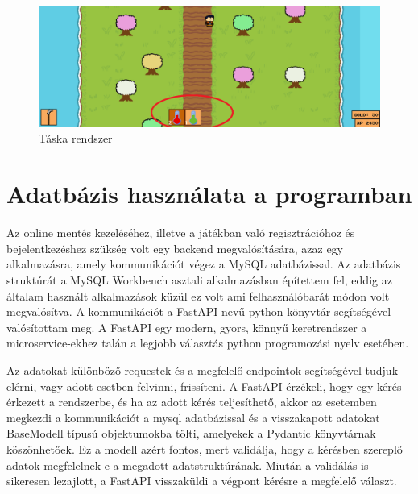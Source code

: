 \begin{figure}[H]
    \centering
    \includegraphics[width=15.5truecm]{images/inventory.png}
    \caption{Táska rendszer}
    \label{fig:Táska rendszer}
\end{figure}


\section{Adatbázis használata a programban}

\indent \indent Az online mentés kezeléséhez, illetve a játékban való regisztrációhoz és bejelentkezéshez szükség volt egy backend megvalósítására, azaz egy alkalmazásra, amely kommunikációt végez a MySQL \cite{mysql} adatbázissal. Az adatbázis struktúrát a MySQL Workbench \cite{mysql-workbench} asztali alkalmazásban építettem fel, eddig az általam használt alkalmazások küzül ez volt ami felhasználóbarát módon volt megvalósítva.  A kommunikációt a FastAPI \cite{fastapi} nevű python könyvtár segítségével valósítottam meg. A FastAPI egy modern, gyors, könnyű keretrendszer a microservice-ekhez talán a legjobb választás python programozási nyelv esetében.

Az adatokat különböző requestek és a megfelelő endpointok segítségével tudjuk elérni, vagy adott esetben felvinni, frissíteni.
 A FastAPI érzékeli, hogy egy kérés érkezett a rendszerbe, és ha az adott kérés teljesíthető,
  akkor az esetemben megkezdi a kommunikációt a mysql adatbázissal és a visszakapott adatokat BaseModell \cite{basemodell} típusú objektumokba tölti,
   amelyekek a Pydantic \cite{pydantic} könyvtárnak köszönhetőek. Ez a modell azért fontos, mert validálja,
    hogy a kérésben szereplő adatok megfelelnek-e a megadott adatstruktúrának.
     Miután a validálás is sikeresen lezajlott, a FastAPI visszaküldi a végpont kérésre a megfelelő választ.

